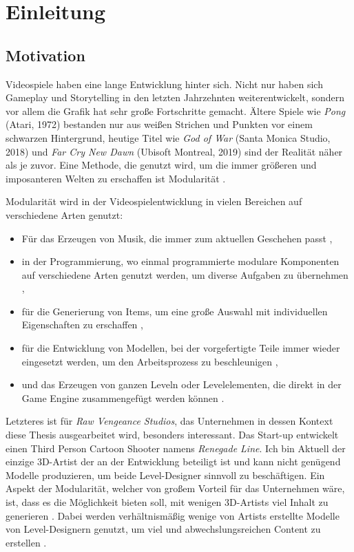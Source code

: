 \chapter{Einleitung}
\section{Motivation}
Videospiele haben eine lange Entwicklung hinter sich. Nicht nur haben sich Gameplay und Storytelling in den letzten Jahrzehnten weiterentwickelt, sondern vor allem die Grafik hat sehr große Fortschritte gemacht. Ältere Spiele wie \textit{Pong} (Atari, 1972) bestanden nur aus weißen Strichen und Punkten vor einem schwarzen Hintergrund, heutige Titel wie \textit{God of War}  (Santa Monica Studio, 2018) und \textit{Far Cry New Dawn} (Ubisoft Montreal, 2019) sind der Realität näher als je zuvor. Eine Methode, die genutzt wird, um die immer größeren und imposanteren Welten zu erschaffen ist Modularität \parencite{Burgess}.
\par
Modularität wird in der Videospielentwicklung in vielen Bereichen auf verschiedene Arten genutzt:
\begin{itemize}
\item Für das Erzeugen von Musik, die immer zum aktuellen Geschehen passt \parencite[S.\,12]{music},
\item in der Programmierung, wo einmal programmierte modulare Komponenten auf verschiedene Arten genutzt werden, um diverse Aufgaben zu übernehmen \parencite{modcode},
\item für die Generierung von Items, um eine große Auswahl mit individuellen Eigenschaften zu erschaffen \parencite{Borderlands},
\item für die Entwicklung von Modellen, bei der vorgefertigte Teile immer wieder eingesetzt werden, um den Arbeitsprozess zu beschleunigen \parencite{ForHonor},
\item und das Erzeugen von ganzen Leveln oder Levelelementen, die direkt in der Game Engine zusammengefügt werden können \parencite{Burgess}.
\end{itemize}
\par
Letzteres ist für \textit{Raw Vengeance Studios}, das Unternehmen in dessen Kontext diese Thesis ausgearbeitet wird, besonders interessant. Das Start-up entwickelt einen Third Person Cartoon Shooter namens \textit{Renegade Line}. Ich bin Aktuell der einzige 3D-Artist der an der Entwicklung beteiligt ist und kann nicht genügend Modelle produzieren, um beide Level-Designer sinnvoll zu beschäftigen. Ein Aspekt der Modularität, welcher von großem Vorteil für das Unternehmen wäre, ist, dass es die Möglichkeit bieten soll, mit wenigen 3D-Artists viel Inhalt zu generieren \parencite{Burgess}. Dabei werden verhältnismäßig wenige von Artists erstellte Modelle von Level-Designern genutzt, um viel und abwechslungsreichen Content zu erstellen \parencite{Burgess}.
\newpage
